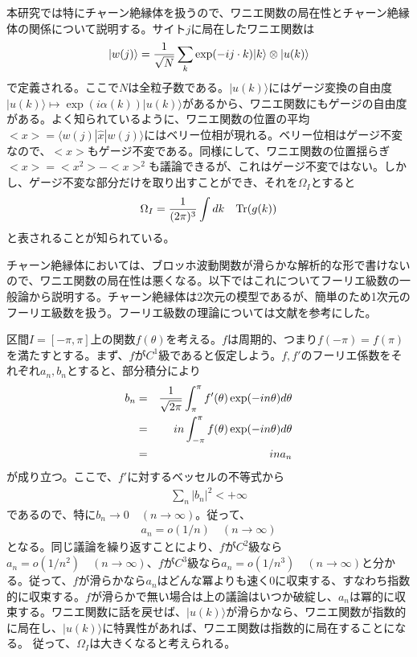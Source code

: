 \documentclass[12pt]{jsbook}
\newcommand{\la}{\langle}
\newcommand{\ra}{\rangle}
\begin{document}
本研究では特にチャーン絶縁体を扱うので、ワニエ関数の局在性とチャーン絶縁体の関係について説明する。サイト$j$に局在したワニエ関数は
\begin{eqnarray}
    |w(j)\ra = {1 \over \sqrt{N}}\displaystyle \sum_k \exp(-ij\cdot k)|k\ra \otimes |u(k)\ra
\end{eqnarray}
で定義される\cite{asboth2016short}。ここで$N$は全粒子数である。$|u(k)\ra$にはゲージ変換の自由度$|u(k)\ra \mapsto \exp(i\alpha(k))|u(k)\ra$があるから、ワニエ関数にもゲージの自由度がある。よく知られているように、ワニエ関数の位置の平均$<x>=\la w(j)|\hat{x}|w(j)\ra$にはベリー位相が現れる\cite{PhysRevB.56.12847,asboth2016short}。ベリー位相はゲージ不変なので、$<x>$もゲージ不変である。同様にして、ワニエ関数の位置揺らぎ$<x>=<x^2>-<x>^2$も議論できるが、これはゲージ不変ではない。しかし、ゲージ不変な部分だけを取り出すことができ、それを$\Omega_I$とすると
\begin{eqnarray}
    \Omega_I = {1 \over (2\pi)^3}\int dk \quad \mathrm{Tr} (g(k)) 
\end{eqnarray}
と表されることが知られている\cite{PhysRevB.56.12847}。

チャーン絶縁体においては、ブロッホ波動関数が滑らかな解析的な形で書けない\cite{KOHMOTO1985343}ので、ワニエ関数の局在性は悪くなる。以下ではこれについてフーリエ級数の一般論から説明する。チャーン絶縁体は2次元の模型であるが、簡単のため1次元のフーリエ級数を扱う。フーリエ級数の理論については文献\cite{1980関数解析}を参考にした。

区間$I=[-\pi,\pi]$上の関数$f(\theta)$を考える。$f$は周期的、つまり$f(-\pi) = f(\pi)$を満たすとする。まず、$f$が$C^1$級であると仮定しよう。$f,f'$のフーリエ係数をそれぞれ$a_n,b_n$とすると、部分積分により
\begin{eqnarray}
    b_n &=& {1\over \sqrt{2\pi}} \int_{\pi}^{\pi} f'(\theta) \exp(-in\theta) d\theta\\
        &=& in \int_{-\pi}^{\pi} f(\theta)\exp(-in\theta)d\theta \\
        &=&ina_n
\end{eqnarray}
が成り立つ。ここで、$f'$に対するベッセルの不等式から
\begin{eqnarray}
    \displaystyle \sum_n |b_n|^2 < +\infty
\end{eqnarray}
であるので、特に$b_n\rightarrow 0\quad (n\rightarrow \infty)$。従って、
\begin{eqnarray}
    a_n = o(1/n)\quad (n\rightarrow \infty)
\end{eqnarray}
となる。同じ議論を繰り返すことにより、$f$が$C^2$級なら$a_n = o(1/n^2)\quad (n\rightarrow \infty)$、$f$が$C^3$級なら$a_n = o(1/n^3)\quad (n\rightarrow \infty)$と分かる。従って、$f$が滑らかなら$a_n$はどんな冪よりも速く$0$に収束する、すなわち指数的に収束する。$f$が滑らかで無い場合は上の議論はいつか破綻し、$a_n$は冪的に収束する。ワニエ関数に話を戻せば、$|u(k)\ra$が滑らかなら、ワニエ関数が指数的に局在し、$|u(k)\ra$に特異性があれば、ワニエ関数は指数的に局在することになる。
従って、$\Omega_I$は大きくなると考えられる。
\end{document}
